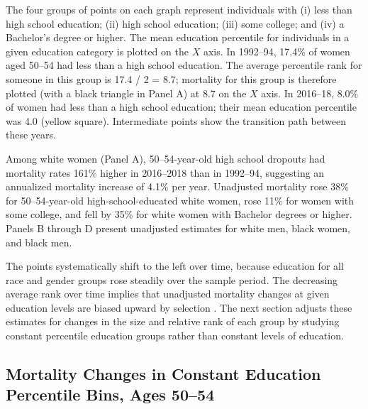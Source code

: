 \documentclass[12pt,letterpaper]{article}
\numberwithin{equation}{section}
\begin{document}
The four groups of points on each graph represent individuals with (i) less than high school education; (ii) high school education; (iii) some college; and (iv) a Bachelor's degree or higher.  The mean education percentile for individuals in a given education category is plotted on the $X$ axis.  In 1992--94, 17.4\% of women aged 50--54 had less than a high school education. The average percentile rank for someone in this group is 17.4 / 2 = 8.7; mortality for this group is therefore plotted (with a black triangle in Panel A) at 8.7 on the $X$ axis. In 2016--18, 8.0\% of women had less than a high school education; their mean education percentile was 4.0 (yellow square). Intermediate points show the transition path between these years.

Among white women (Panel A), 50--54-year-old high school dropouts had mortality rates 161\% higher in 2016--2018 than in 1992--94, suggesting an annualized mortality increase of 4.1\% per year. Unadjusted mortality rose 38\% for 50--54-year-old high-school-educated white women, rose 11\% for women with some college, and fell by 35\% for white women with Bachelor degrees or higher. Panels B through D present unadjusted estimates for white men, black women, and black men.

The points systematically shift to the left over time, because education for all race and gender groups rose steadily over the sample period. The decreasing average rank over time implies that unadjusted mortality changes at given education levels are biased upward by selection \citep{Dowd2014,Bound2015,Currie2018}. The next section adjusts these estimates for changes in the size and relative rank of each group by studying constant percentile education groups rather than constant levels of education.

\subsection{Mortality Changes in Constant Education Percentile Bins, Ages 50--54}
\label{sec:changes_50}
\end{document}
